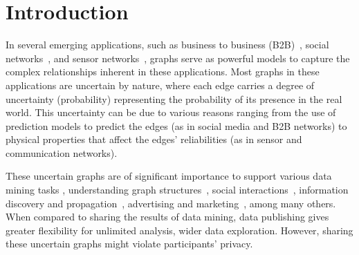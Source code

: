 \section{Introduction}
\label{sec:Intro}

In several emerging applications, such as business to business (B2B)~\cite{Lin_B2B}, social networks~\cite{Adar_Managing_2007, Kempe_Maximizing_2003}, and sensor networks~\cite{ZhangSensorNetwork}, graphs serve as powerful models to capture the complex relationships inherent in these applications. 
Most graphs in these applications are uncertain by nature, where each edge carries a degree of uncertainty (probability) representing the probability of its presence in the real world. This uncertainty can be due to various reasons ranging from the use of prediction models to predict the edges (as in social media and B2B networks) to physical properties that affect the edges' reliabilities (as in sensor and communication networks).  

These uncertain graphs are of significant importance to support various data mining tasks {\eg}, 
understanding  graph structures~\cite{Bollacker_Freebase_2008,Krogan_Global_2006}, social interactions~\cite{Cho_Friendship_2011}, 
information discovery and propagation~\cite{Zhao_Detecting_2014}, advertising and marketing~\cite{Kempe_Maximizing_2003}, among many others.
When compared to sharing the results of data mining, data publishing gives greater flexibility for unlimited analysis,  wider data exploration. However, sharing these uncertain graphs might violate participants' privacy.   

